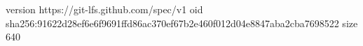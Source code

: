 version https://git-lfs.github.com/spec/v1
oid sha256:91622d28ef6e6f9691ffd86ac370ef67b2e460f012d04e8847aba2cba7698522
size 640
